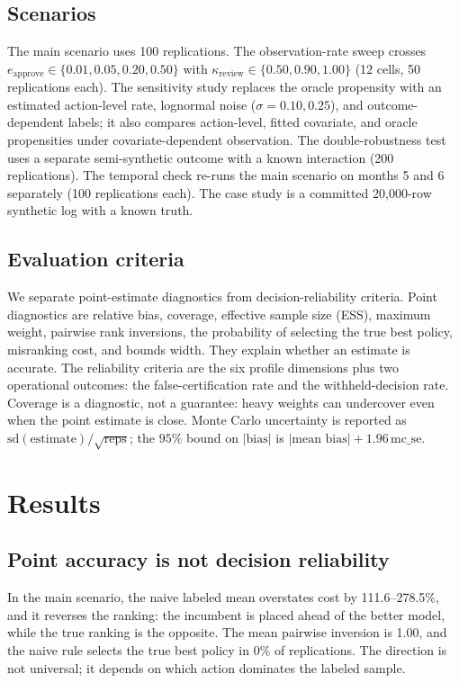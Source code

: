 \documentclass[conference]{IEEEtran}
\begin{document}
\subsection{Scenarios}
The main scenario uses 100 replications. The observation-rate sweep crosses $e_{\text{approve}}\in\{0.01,0.05,0.20,0.50\}$ with $\kappa_{\text{review}}\in\{0.50,0.90,1.00\}$ (12 cells, 50 replications each). The sensitivity study replaces the oracle propensity with an estimated action-level rate, lognormal noise ($\sigma=0.10,0.25$), and outcome-dependent labels; it also compares action-level, fitted covariate, and oracle propensities under covariate-dependent observation. The double-robustness test uses a separate semi-synthetic outcome with a known interaction (200 replications). The temporal check re-runs the main scenario on months 5 and 6 separately (100 replications each). The case study is a committed 20,000-row synthetic log with a known truth.

\subsection{Evaluation criteria}
We separate point-estimate diagnostics from decision-reliability criteria. Point diagnostics are relative bias, coverage, effective sample size (ESS), maximum weight, pairwise rank inversions, the probability of selecting the true best policy, misranking cost, and bounds width. They explain whether an estimate is accurate. The reliability criteria are the six profile dimensions plus two operational outcomes: the false-certification rate and the withheld-decision rate. Coverage is a diagnostic, not a guarantee: heavy weights can undercover even when the point estimate is close. Monte Carlo uncertainty is reported as $\mathrm{sd}(\text{estimate})/\sqrt{\text{reps}}$; the $95\%$ bound on $|\text{bias}|$ is $|\text{mean bias}|+1.96\,\mathrm{mc\_se}$.

\section{Results}

\subsection{Point accuracy is not decision reliability}
In the main scenario, the naive labeled mean overstates cost by 111.6--278.5\%, and it reverses the ranking: the incumbent is placed ahead of the better model, while the true ranking is the opposite. The mean pairwise inversion is 1.00, and the naive rule selects the true best policy in 0\% of replications. The direction is not universal; it depends on which action dominates the labeled sample.
\end{document}
